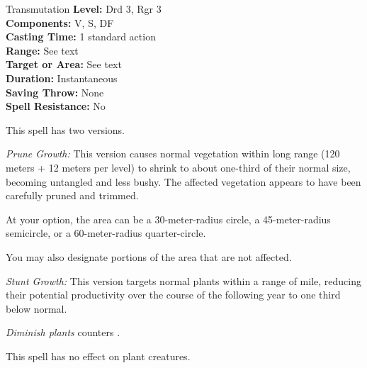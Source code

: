 {Transmutation}
{
	\textbf{Level:}
	Drd 3, Rgr 3\\
	\textbf{Components:}
	V, S, DF\\
	\textbf{Casting Time:}
	1 standard action\\
	\textbf{Range:}
	See text\\
	\textbf{Target or Area:}
	See text\\
	\textbf{Duration:}
	Instantaneous\\
	\textbf{Saving Throw:}
	None\\
	\textbf{Spell Resistance:}
	No\\
}
{
	This spell has two versions.

	\textit{Prune Growth:}
	This version causes normal vegetation within long range (120 meters + 12 meters per level) to shrink to about one-third of their normal size, becoming untangled and less bushy. The affected vegetation appears to have been carefully pruned and trimmed.

	At your option, the area can be a 30-meter-radius circle, a 45-meter-radius semicircle, or a 60-meter-radius quarter-circle.

	You may also designate portions of the area that are not affected.

	\textit{Stunt Growth:}
	This version targets normal plants within a range of \onehalf mile, reducing their potential productivity over the course of the following year to one third below normal.

	\emph{Diminish plants} counters .

	This spell has no effect on plant creatures.

}
